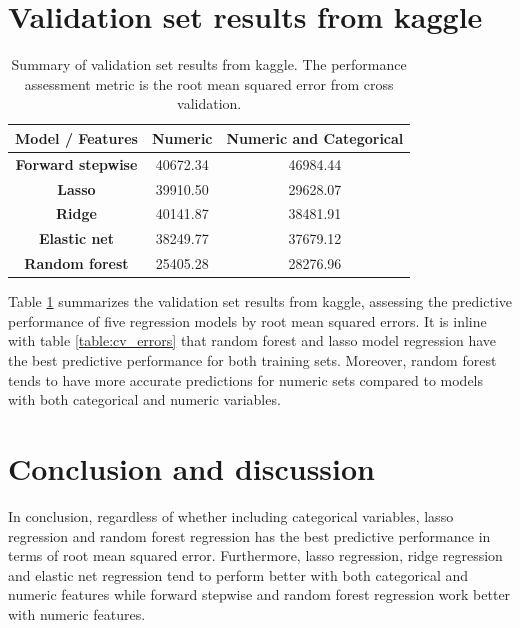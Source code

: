 \documentclass[letterpaper,12pt,twoside,]{pinp}
\begin{document}
\hypertarget{validation-set-results-from-kaggle}{%
\section{Validation set results from
kaggle}\label{validation-set-results-from-kaggle}}

\begin{table}
\begin{tabular}{ |c|c|c| } 
\hline
\textbf{Model / Features} & \textbf{Numeric} & \textbf{Numeric and Categorical} \\
\hline
\textbf{Forward stepwise} & 40672.34  & 46984.44 \\ 
\textbf{Lasso} & 39910.50 & 29628.07 \\
\textbf{Ridge} & 40141.87 & 38481.91 \\
\textbf{Elastic net} & 38249.77 &  37679.12\\
\textbf{Random forest} & 25405.28 & 28276.96\\
\hline
\end{tabular}
\centering
\caption{Summary of validation set results from kaggle. The performance assessment metric is the root mean squared error from cross validation.}
\label{table:kaggle_results}
\end{table}

Table \ref{table:kaggle_results} summarizes the validation set results
from kaggle, assessing the predictive performance of five regression
models by root mean squared errors. It is inline with table
\ref{table:cv_errors} that random forest and lasso model regression have
the best predictive performance for both training sets. Moreover, random
forest tends to have more accurate predictions for numeric sets compared
to models with both categorical and numeric variables.

\hypertarget{conclusion-and-discussion}{%
\section{Conclusion and discussion}\label{conclusion-and-discussion}}

In conclusion, regardless of whether including categorical variables,
lasso regression and random forest regression has the best predictive
performance in terms of root mean squared error. Furthermore, lasso
regression, ridge regression and elastic net regression tend to perform
better with both categorical and numeric features while forward stepwise
and random forest regression work better with numeric features.
\end{document}
